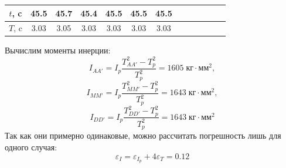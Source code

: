 \documentclass[a4paper, 12pt]{article}
\begin{document}
\begin{enumerate}
\begin{table}[H]
\begin{tabular}{|ccccccccccccc|}
			\multicolumn{1}{|c|}{$t$, c}  & \multicolumn{1}{c|}{45.5} & \multicolumn{1}{c|}{45.7} & \multicolumn{1}{c|}{45.4} & \multicolumn{1}{c|}{45.5} & \multicolumn{1}{c|}{45.5} & \multicolumn{1}{c|}{45.5}    & \multicolumn{1}{c|}{}     & \multicolumn{1}{c|}{}     & \multicolumn{1}{c|}{}     & \multicolumn{1}{c|}{}     & \multicolumn{1}{c|}{}               &              \\ \hline
			\multicolumn{1}{|c|}{$T$, c}  & \multicolumn{1}{c|}{3.03} & \multicolumn{1}{c|}{3.05} & \multicolumn{1}{c|}{3.03} & \multicolumn{1}{c|}{3.03} & \multicolumn{1}{c|}{3.03} & \multicolumn{1}{c|}{3.03}    & \multicolumn{1}{c|}{}     & \multicolumn{1}{c|}{}     & \multicolumn{1}{c|}{}     & \multicolumn{1}{c|}{}     & \multicolumn{1}{c|}{}               &              \\ \hline
			\end{tabular}
		\end{table}

		Вычислим моменты инерции:
		$$ I_{AA'} = I_p \frac{T_{AA'}^2 - T_p^2}{T_p^2} = 1605\; \text{кг} \cdot \text{мм} ^2, $$
		$$ I_{MM'} = I_p \frac{T_{MM'}^2 - T_p^2}{T_p^2} = 1643\; \text{кг} \cdot \text{мм} ^2, $$
		$$ I_{DD'} = I_p \frac{T_{DD'}^2 - T_p^2}{T_p^2} = 1643\; \text{кг} \cdot \text{мм} ^2  $$
		Так как они примерно одинаковые, можно рассчитать погрешность лишь для одного случая:
		$$ \varepsilon_I = \varepsilon_{I_p} + 4\varepsilon_{T} = 0.12 $$

	\end{enumerate}


\end{document}
